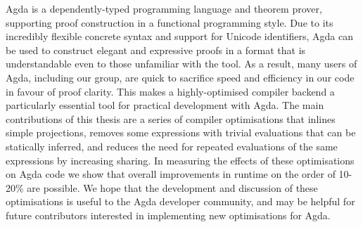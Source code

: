 Agda is a dependently-typed programming language and theorem prover, supporting proof construction in a functional programming style. Due to its incredibly flexible concrete syntax and support for Unicode identifiers, Agda can be used to construct elegant and expressive proofs in a format that is understandable even to those unfamiliar with the tool. As a result, many users of Agda, including our group, are quick to sacrifice speed and efficiency in our code in favour of proof clarity. This makes a highly-optimised compiler backend a particularly essential tool for practical development with Agda. The main contributions of this thesis are a series of compiler optimisations that inlines simple projections, removes some expressions with trivial evaluations that can be statically inferred, and reduces the need for repeated evaluations of the same expressions by increasing sharing. In measuring the effects of these optimisations on Agda code we show that overall improvements in runtime on the order of 10-20\% are possible. We hope that the development and discussion of these optimisations is useful to the Agda developer community, and may be helpful for future contributors interested in implementing new optimisations for Agda.
